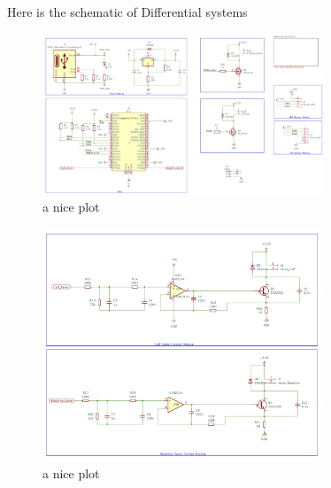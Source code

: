 Here is the schematic of Differential systems 
\begin{figure}[h]
    \centering
    \captionsetup{justification=centering}
    \includegraphics[width=0.75\textwidth]{img/schematic_diff-1.png}
    \caption{a nice plot}
    \label{fig:mesh1}
\end{figure}

\begin{figure}[h]
    \centering
    \captionsetup{justification=centering}
    \includegraphics[width=0.75\textwidth]{img/schematic_diff-2.png}
    \caption{a nice plot}
    \label{fig:mesh1}
\end{figure}
